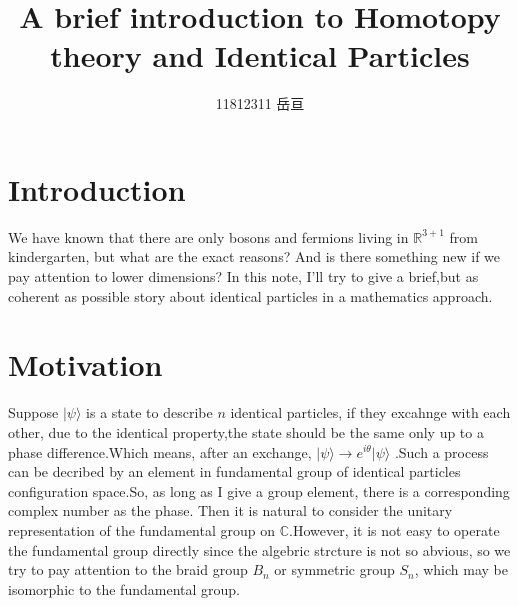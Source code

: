 \documentclass[UTF8]{ctexart}
\title{A brief introduction to Homotopy theory and Identical Particles}
\author{11812311 岳亘}
\theoremstyle{definition}
\theoremstyle{remark}
\begin{document}
\maketitle	
	\section*{Introduction}
We have known that there are only bosons and fermions living in $\mathbb{R}^{3+1}$ from kindergarten, but what are the exact reasons? And is there something new if we pay attention to lower dimensions? In this note, I'll try to give a brief,but as coherent as possible story about identical particles in a mathematics approach.
\section*{Motivation} 
Suppose $\vert\psi\rangle$ is a state to describe $n$ identical particles, if they excahnge with each other, due to the identical property,the state should be the same only up to a phase difference.Which means, after an exchange, $\vert\psi\rangle\rightarrow e^{i\theta}\vert\psi\rangle$ .Such a process can be decribed by an element in fundamental group of identical particles configuration space.So, as long as I give a group element, there is a corresponding complex number as the phase. Then it is natural to consider the unitary representation of the fundamental group on $\mathbb{C}$.However, it is not easy to operate the fundamental group directly since the algebric strcture is not so abvious, so we try to pay attention to the braid group $B_n$ or symmetric group $S_n$, which may be isomorphic to the fundamental group.  
\end{document}
